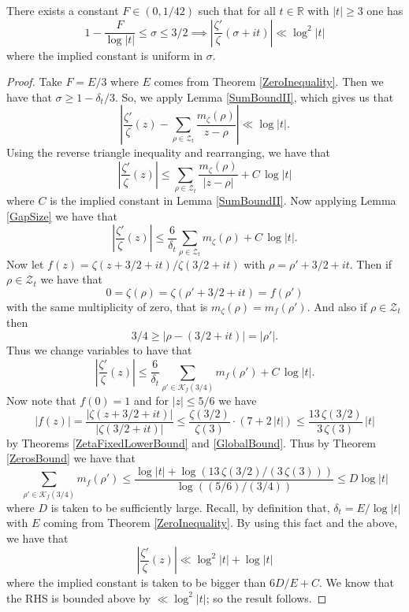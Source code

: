 \begin{theorem}[LogDerivZetaUniformLogSquaredBoundStrip]
\label{LogDerivZetaUniformLogSquaredBoundStrip}
\leanok
There exists a constant $F\in(0,1/42)$ such that
    for all $t\in\mathbb{R}$ with $|t|\geq 3$ one has
    $$1-\frac{F}{\log|t|}\leq\sigma\leq 3/2
      \implies\left|\frac{\zeta'}{\zeta}(\sigma+it)\right|\ll\log^2|t|$$
    where the implied constant is uniform in $\sigma$.
\end{theorem}
\begin{proof}
\leanok
Take $F=E/3$ where $E$ comes from Theorem \ref{ZeroInequality}.
    Then we have that $\sigma\geq 1-\delta_t/3$. So, we apply Lemma \ref{SumBoundII},
    which gives us that
    $$\left|\frac{\zeta'}{\zeta}(z)
      -\sum_{\rho\in\mathcal{Z}_t}\frac{m_\zeta(\rho)}{z-\rho}\right|\ll\log|t|.$$
    Using the reverse triangle inequality and rearranging, we have that
    $$\left|\frac{\zeta'}{\zeta}(z)\right|
      \leq\sum_{\rho\in\mathcal{Z}_t}\frac{m_\zeta(\rho)}{|z-\rho|}+C\,\log|t|$$
    where $C$ is the implied constant in Lemma \ref{SumBoundII}.
    Now applying Lemma \ref{GapSize} we have that
    $$\left|\frac{\zeta'}{\zeta}(z)\right|
      \leq\frac{6}{\delta_t}\sum_{\rho\in\mathcal{Z}_t}m_\zeta(\rho)+C\,\log|t|.$$
    Now let $f(z)=\zeta(z+3/2+it)/\zeta(3/2+it)$ with $\rho=\rho'+3/2+it$.
    Then if $\rho\in\mathcal{Z}_t$ we have that
    $$0=\zeta(\rho)=\zeta(\rho'+3/2+it)=f(\rho')$$
    with the same multiplicity of zero, that is $m_\zeta(\rho)=m_f(\rho')$.
    And also if $\rho\in\mathcal{Z}_t$ then
    $$3/4\geq|\rho-(3/2+it)|=|\rho'|.$$
    Thus we change variables to have that
    $$\left|\frac{\zeta'}{\zeta}(z)\right|
      \leq\frac{6}{\delta_t}\sum_{\rho'\in\mathcal{K}_f(3/4)}m_f(\rho')+C\,\log|t|.$$
    Now note that $f(0)=1$ and for $|z|\leq 5/6$ we have
    $$|f(z)|=\frac{|\zeta(z+3/2+it)|}{|\zeta(3/2+it)|}
      \leq\frac{\zeta(3/2)}{\zeta(3)}\cdot(7+2\,|t|)\leq\frac{13\,\zeta(3/2)}{3\,\zeta(3)}\,|t|$$
    by Theorems \ref{ZetaFixedLowerBound} and \ref{GlobalBound}.
    Thus by Theorem \ref{ZerosBound} we have that
    $$\sum_{\rho'\in\mathcal{K}_f(3/4)}m_f(\rho')
      \leq\frac{\log|t|+\log(13\,\zeta(3/2)/(3\,\zeta(3)))}{\log((5/6)/(3/4))}\leq D\log|t|$$
    where $D$ is taken to be sufficiently large.
    Recall, by definition that, $\delta_t=E/\log|t|$ with $E$ coming from
    Theorem \ref{ZeroInequality}. By using this fact and the above, we have that
    $$\left|\frac{\zeta'}{\zeta}(z)\right|\ll\log^2|t|+\log|t|$$
    where the implied constant is taken to be bigger than $6D/E+C$.
    We know that the RHS is bounded above by $\ll\log^2|t|$; so the result follows.
\end{proof}
